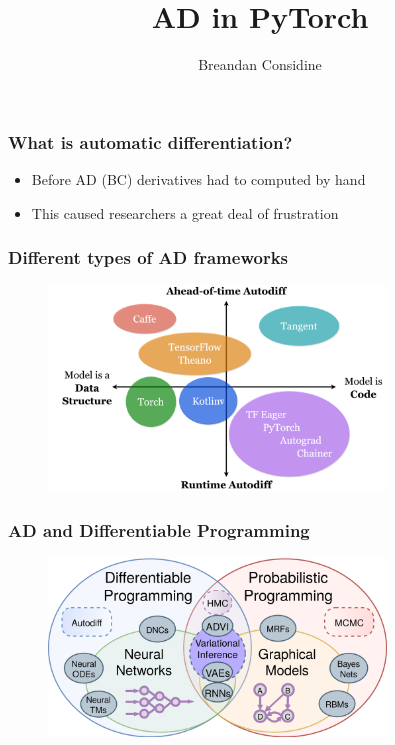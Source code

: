 \documentclass{beamer}
\title{AD in PyTorch}
\author{Breandan Considine}
\begin{document}
    \frame{\titlepage}

    \begin{frame}
        \frametitle{What is automatic differentiation?}
        \begin{itemize}
            \item Before AD (BC) derivatives had to computed by hand
            \item This caused researchers a great deal of frustration
        \end{itemize}
    \end{frame}

    \begin{frame}
        \frametitle{Different types of AD frameworks}
        \begin{figure}[H]
            \centering
            \includegraphics[width=0.8\textwidth]{ad_dsls.png}
        \end{figure}
    \end{frame}

    \begin{frame}
        \frametitle{AD and Differentiable Programming}
        \begin{figure}[H]
            \centering
            \includegraphics[width=0.8\textwidth]{diff_prob_prog.png}
        \end{figure}
    \end{frame}
\end{document}
